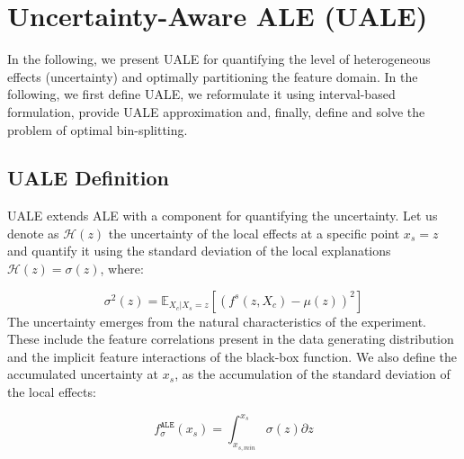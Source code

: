 \documentclass[twoside]{article}
\newcommand{\dfdx}{f^s}
\begin{document}

\section{Uncertainty-Aware ALE (UALE)}
\label{sec:UALE}

In the following, we present UALE for quantifying the level of heterogeneous effects
(uncertainty) and optimally partitioning the feature domain. 
In the following, we first define UALE, we reformulate it
using interval-based formulation, provide UALE approximation and,
finally, define and solve the problem of optimal bin-splitting.

\subsection{UALE Definition}
\label{sec:UALE-definition-1}

UALE extends ALE with a component for quantifying the uncertainty. Let
us denote as \(\mathcal{H}(z)\) the uncertainty of the local effects
at a specific point \(x_s=z\) and quantify it using the standard
deviation of the local explanations \(\mathcal{H}(z) = \sigma(z)\),
where:

\begin{equation}
  \label{eq:ALE_var}
  \sigma^2(z) = \mathbb{E}_{X_c|X_s=z}\left [ \left (\dfdx (z, X_c) - \mu(z) \right )^2 \right ] 
\end{equation}
\noindent
The uncertainty emerges from the natural characteristics of the
experiment. These include the feature correlations present in the data
generating distribution and the implicit feature interactions of the
black-box function. We also define the accumulated uncertainty at
\(x_s\), as the accumulation of the standard deviation of the local
effects:

\begin{equation}
  \label{eq:ALE_acc_unc}
  f^{\mathtt{ALE}}_{\sigma}(x_s) = \int_{x_{s, min}}^{x_s} \sigma(z) \partial z
\end{equation}
\noindent
\end{document}
